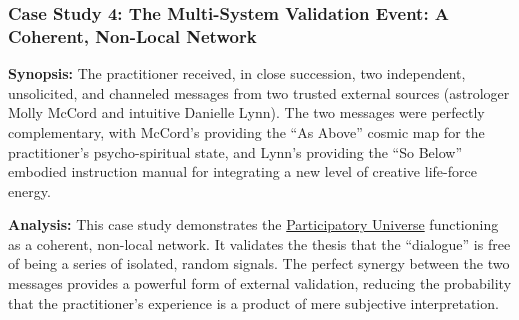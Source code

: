 \documentclass{article}
\begin{document}
    \begin{nobullet} %



        \subsubsection*{Case Study 4: The Multi-System Validation Event: A Coherent, Non-Local Network \csMultiSystemValidationVersion} \label{case_study_4}

        \begin{nobullet}
            \item \textbf{Synopsis:} The practitioner received, in close succession, two independent, unsolicited, and channeled messages from two trusted external sources (astrologer Molly McCord and intuitive Danielle Lynn). The two messages were perfectly complementary, with McCord's providing the ``As Above'' cosmic map for the practitioner's psycho-spiritual state, and Lynn's providing the ``So Below'' embodied instruction manual for integrating a new level of creative life-force energy.

            \item \textbf{Analysis:} This case study demonstrates the \hyperlink{gloss:participatory_universe}{Participatory Universe} functioning as a coherent, non-local network. It validates the thesis that the ``dialogue'' is free of being a series of isolated, random signals. The perfect synergy between the two messages provides a powerful form of external validation, reducing the probability that the practitioner's experience is a product of mere subjective interpretation.

        \end{nobullet}



\end{nobullet}
\end{document}
